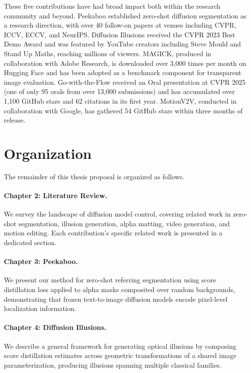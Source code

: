 \vspace{0.5em}

These five contributions have had broad impact both within the research community and beyond. Peekaboo established zero-shot diffusion segmentation as a research direction, with over 40 follow-on papers at venues including CVPR, ICCV, ECCV, and NeurIPS. Diffusion Illusions received the CVPR 2023 Best Demo Award and was featured by YouTube creators including Steve Mould and Stand Up Maths, reaching millions of viewers. MAGICK, produced in collaboration with Adobe Research, is downloaded over 3,000 times per month on Hugging Face and has been adopted as a benchmark component for transparent image evaluation. Go-with-the-Flow received an Oral presentation at CVPR 2025 (one of only 95 orals from over 13,000 submissions) and has accumulated over 1,100 GitHub stars and 62 citations in its first year. MotionV2V, conducted in collaboration with Google, has gathered 54 GitHub stars within three months of release.

\section{Organization}

The remainder of this thesis proposal is organized as follows.

\paragraph{Chapter 2: Literature Review.} We survey the landscape of diffusion model control, covering related work in zero-shot segmentation, illusion generation, alpha matting, video generation, and motion editing. Each contribution's specific related work is presented in a dedicated section.

\paragraph{Chapter 3: Peekaboo.} We present our method for zero-shot referring segmentation using score distillation loss applied to alpha masks composited over random backgrounds, demonstrating that frozen text-to-image diffusion models encode pixel-level localization information.

\paragraph{Chapter 4: Diffusion Illusions.} We describe a general framework for generating optical illusions by composing score distillation estimates across geometric transformations of a shared image parameterization, producing illusions spanning multiple classical families.

